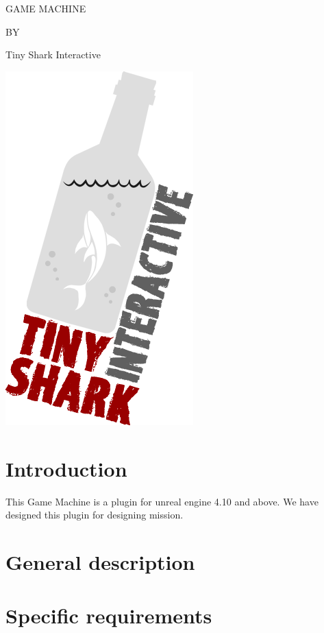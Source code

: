 \documentclass[12pt]{article}
\begin{document}
\pagecolor{TSIBlack}
\color{white}
\tableofcontents
\begin{titlepage}
\begin{center}
\huge GAME MACHINE
\end{center}
\begin{center}
 BY
\end{center}
\begin{center}
\huge Tiny Shark Interactive
\end{center}
\begin{center}
\includegraphics[scale=0.6]{banner.png}
\end{center}
\end{titlepage}
\section{Introduction}
This Game Machine is a plugin for unreal engine 4.10 and above.
We have designed this plugin for designing mission.
\section{General description}
\section{Specific requirements}
\end{document}
